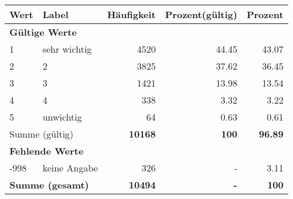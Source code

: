      \begin{longtable}{lXrrr}
     \toprule
     \textbf{Wert} & \textbf{Label} & \textbf{Häufigkeit} & \textbf{Prozent(gültig)} & \textbf{Prozent} \\
     \endhead
     \midrule
     \multicolumn{5}{l}{\textbf{Gültige Werte}}\\

     1 &
     \multicolumn{1}{X}{ sehr wichtig   } &


       \num{4520} &
       \num[round-mode=places,round-precision=2]{44.45} &
         \num[round-mode=places,round-precision=2]{43.07} \\

     2 &
     \multicolumn{1}{X}{ 2   } &


       \num{3825} &
       \num[round-mode=places,round-precision=2]{37.62} &
         \num[round-mode=places,round-precision=2]{36.45} \\

     3 &
     \multicolumn{1}{X}{ 3   } &


       \num{1421} &
       \num[round-mode=places,round-precision=2]{13.98} &
         \num[round-mode=places,round-precision=2]{13.54} \\

     4 &
     \multicolumn{1}{X}{ 4   } &


       \num{338} &
       \num[round-mode=places,round-precision=2]{3.32} &
         \num[round-mode=places,round-precision=2]{3.22} \\

     5 &
     \multicolumn{1}{X}{ unwichtig   } &


       \num{64} &
       \num[round-mode=places,round-precision=2]{0.63} &
         \num[round-mode=places,round-precision=2]{0.61} \\
     \midrule
     \multicolumn{2}{l}{Summe (gültig)} &
       \textbf{\num{10168}} &
     \textbf{\num{100}} &
       \textbf{\num[round-mode=places,round-precision=2]{96.89}} \\
     \multicolumn{5}{l}{\textbf{Fehlende Werte}}\\
       -998 &
       keine Angabe &
         \num{326} &
        - &
         \num[round-mode=places,round-precision=2]{3.11} \\
     \midrule
     \multicolumn{2}{l}{\textbf{Summe (gesamt)}} &
          \textbf{\num{10494}} &
        \textbf{-} &
        \textbf{\num{100}} \\
     \bottomrule
     \end{longtable}
     
